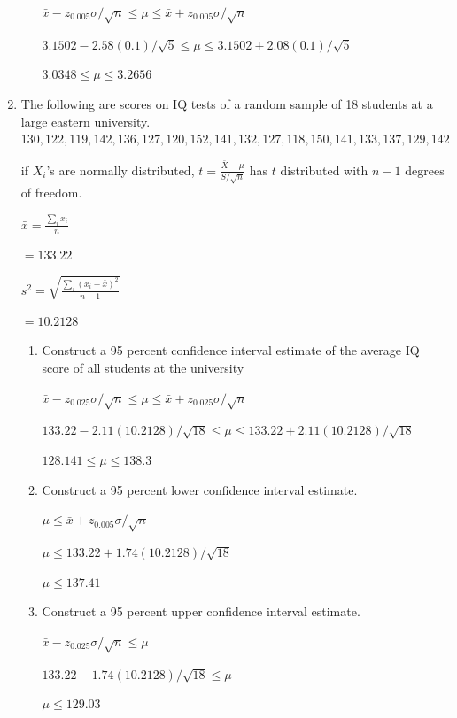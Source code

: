 \documentclass{article}
\begin{document}
\begin{enumerate}
\begin{enumerate}
        $\bar{x} - z_{0.005}\sigma/\sqrt{n} \leq \mu \leq \bar{x} + z_{0.005}\sigma/\sqrt{n}$

        $3.1502 - 2.58(0.1)/\sqrt{5} \leq \mu \leq 3.1502 + 2.08(0.1)/\sqrt{5}$

        $3.0348 \leq \mu \leq 3.2656$
    \end{enumerate}

    \item  The following are scores on IQ tests of a random sample of 18 students at a large eastern university.
    $130, 122, 119, 142, 136, 127, 120, 152, 141, 132, 127, 118, 150, 141, 133, 137, 129, 142$
    
    if $X_i$'s are normally distributed, $\displaystyle t=\frac{\bar{X}-\mu}{S/\sqrt{n}}$ has $t$ distributed with $n-1$ degrees of freedom.

    $\displaystyle \bar{x} = \frac{\sum_{i}{x_i}}{n}$

    $= 133.22$
    
    $\displaystyle s^2=\sqrt{\frac{\sum_i{(x_i-\bar{x})^2}}{n-1}}$

    $= 10.2128$

    \begin{enumerate}
        \item Construct a 95 percent confidence interval estimate of the average IQ score of all students at the university
        
        $\bar{x} - z_{0.025}\sigma/\sqrt{n} \leq \mu \leq \bar{x} + z_{0.025}\sigma/\sqrt{n}$

        $133.22 - 2.11(10.2128)/\sqrt{18} \leq \mu \leq 133.22 + 2.11(10.2128)/\sqrt{18}$

        $128.141 \leq \mu \leq 138.3$

        \item Construct a 95 percent lower confidence interval estimate.
        
        $\mu \leq \bar{x} + z_{0.005}\sigma/\sqrt{n}$

        $\mu \leq 133.22 + 1.74(10.2128)/\sqrt{18}$

        $\mu \leq 137.41$

        \item Construct a 95 percent upper confidence interval estimate.
        
        $\bar{x} - z_{0.025}\sigma/\sqrt{n} \leq \mu$

        $133.22 - 1.74(10.2128)/\sqrt{18} \leq \mu$

        $\mu \leq 129.03$


\end{enumerate}
\end{enumerate}
\end{document}
